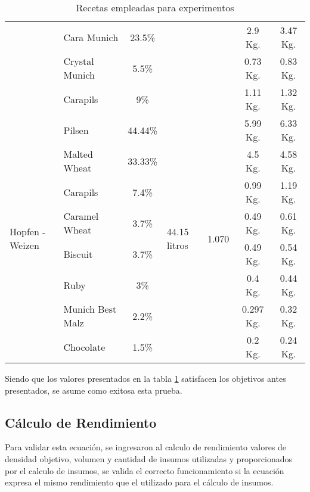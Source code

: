 \begin{table}[h]
\begin{tabularx}{\textwidth}{|X|X|X|X|X|X|X|}
         & Cara Munich & \multicolumn{1}{c|}{23.5\%} & & &\multicolumn{1}{c|}{2.9 Kg.} &\multicolumn{1}{c|}{3.47 Kg.} \\
        & Crystal Munich & \multicolumn{1}{c|}{5.5\%} & & &\multicolumn{1}{c|}{0.73 Kg.} &\multicolumn{1}{c|}{0.83 Kg.} \\
        & Carapils & \multicolumn{1}{c|}{9\%} & & &\multicolumn{1}{c|}{1.11 Kg.} &\multicolumn{1}{c|}{1.32 Kg.} \\
        \hline
        \multirow{8}{2cm}{Hopfen - Weizen} & Pilsen &\multicolumn{1}{c|}{44.44\%}  &\multirow{8}{2cm}{44.15 litros}  &\multirow{8}{2cm}{1.070} & \multicolumn{1}{c|}{5.99 Kg.} & \multicolumn{1}{c|}{6.33 Kg.}\\
         & Malted Wheat & \multicolumn{1}{c|}{33.33\%} & & &\multicolumn{1}{c|}{4.5 Kg.} &\multicolumn{1}{c|}{4.58 Kg.} \\
         & Carapils & \multicolumn{1}{c|}{7.4\%} & & &\multicolumn{1}{c|}{0.99 Kg.} &\multicolumn{1}{c|}{1.19 Kg.} \\
         & Caramel Wheat & \multicolumn{1}{c|}{3.7\%} & & &\multicolumn{1}{c|}{0.49 Kg.} &\multicolumn{1}{c|}{0.61 Kg.} \\
         & Biscuit & \multicolumn{1}{c|}{3.7\%} & & &\multicolumn{1}{c|}{0.49 Kg.} &\multicolumn{1}{c|}{0.54 Kg.} \\
         & Ruby & \multicolumn{1}{c|}{3\%} & & &\multicolumn{1}{c|}{0.4 Kg.} &\multicolumn{1}{c|}{0.44 Kg.} \\
         & Munich Best Malz & \multicolumn{1}{c|}{2.2\%} & & &\multicolumn{1}{c|}{0.297 Kg.} &\multicolumn{1}{c|}{0.32 Kg.} \\
         & Chocolate & \multicolumn{1}{c|}{1.5\%} & & &\multicolumn{1}{c|}{0.2 Kg.} &\multicolumn{1}{c|}{0.24 Kg.} \\
        \hline
    \end{tabularx}
    \caption{Recetas empleadas para experimentos}
    \label{tab:TablaRecetaExperimentos}
\end{table}
\par Siendo que los valores presentados en la tabla \ref{tab:TablaRecetaExperimentos} satisfacen los objetivos antes presentados, se asume como exitosa esta prueba.

\subsection{Cálculo de Rendimiento}
Para validar esta ecuación, se ingresaron al calculo de rendimiento valores de densidad objetivo, volumen y cantidad de insumos utilizadas y proporcionados por el calculo de insumos, se valida el correcto funcionamiento si la ecuación expresa el mismo rendimiento que el utilizado para el cálculo de insumos.


